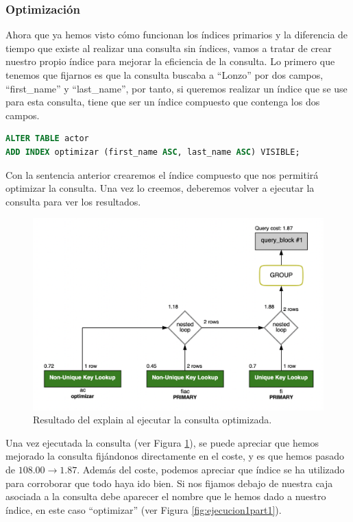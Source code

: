 \documentclass{db-practice}
\begin{document}
\subsubsection*{Optimización}

Ahora que ya hemos visto cómo funcionan los índices primarios y la diferencia de tiempo que existe al realizar una consulta sin índices, vamos a tratar de crear nuestro propio índice para mejorar la eficiencia de la consulta. Lo primero que tenemos que fijarnos es que la consulta buscaba a ``Lonzo'' por dos campos, ``first\_name'' y ``last\_name'', por tanto, si queremos realizar un índice que se use para esta consulta, tiene que ser un índice compuesto que contenga los dos campos.

\begin{lstlisting}[language=SQL]
ALTER TABLE actor
ADD INDEX optimizar (first_name ASC, last_name ASC) VISIBLE;
\end{lstlisting}

Con la sentencia anterior crearemos el índice compuesto que nos permitirá optimizar la consulta. Una vez lo creemos, deberemos volver a ejecutar la consulta para ver los resultados.

\begin{figure}[ht]
    \centering
    \includegraphics[width=0.8\columnwidth]{figs/ejecucion1optimizada.png}
    \caption{Resultado del explain al ejecutar la consulta optimizada.}\label{fig:ejecucion1optimizada}
\end{figure}

Una vez ejecutada la consulta (ver Figura \ref{fig:ejecucion1optimizada}), se puede apreciar que hemos mejorado la consulta fijándonos directamente en el coste, y es que hemos pasado de $108.00 \rightarrow 1.87$. Además del coste, podemos apreciar que índice se ha utilizado para corroborar que todo haya ido bien. Si nos fijamos debajo de nuestra caja asociada a la consulta debe aparecer el nombre que le hemos dado a nuestro índice, en este caso ``optimizar'' (ver Figura \ref{fig:ejecucion1part1}).
\end{document}
